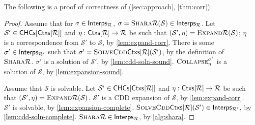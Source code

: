 The following is a proof of correctness of \sys
(\autoref{sec:approach}, \autoref{thm:corr}).
%
\begin{proof}
  Assume that for $\sigma \in \mathsf{Interps_{  \mathcal{R}  }}$, $\sigma =
  \textsc{Shara}{ \mathcal{R} }( \mathcal{S} ) \in \mathsf{Interps_{  \mathcal{R}  }}$.
  Let $\mathcal{S'} \in \mathsf{CHCs}[  \mathsf{Ctxs}[  \mathcal{R}  ]  ]$ and $\eta :
  \mathsf{Ctxs}[  \mathcal{R}  ] \to \mathcal{R}$ be such that $(\mathcal{S}',
  \eta) = \textsc{Expand}{ \mathcal{R} }( \mathcal{S} )$;
  $\eta$ is a correspondence from $\mathcal{S'}$ to $\mathcal{S}$, by
  \autoref{lem:expand-corr}.
  There is some $\sigma' \in \mathsf{Interps_{  \mathcal{R}'  }}$ such that
  $\sigma' = \textsc{SolveCdd}{ \mathsf{Ctxs}[  \mathcal{R}  ] }( \mathcal{S}' )$, by
  the definition of $\textsc{Shara}{ \mathcal{R} }$.
  $\sigma'$ is a solution of $\mathcal{S}'$, by
  \autoref{lem:cdd-soln-sound}.
  $\textsc{Collapse}_{ \eta }^{ \sigma' }$ is a solution of $\mathcal{S}$, by
  \autoref{lem:expansion-sound}.

  Assume that $\mathcal{S}$ is solvable.
  Let $\mathcal{S'} \in \mathsf{CHCs}[  \mathsf{Ctxs}[  \mathcal{R}  ]  ]$ and $\eta :
  \mathsf{Ctxs}[  \mathcal{R}  ] \to \mathcal{R}$ be such that $(\mathcal{S}',
  \eta) = \textsc{Expand}{ \mathcal{R} }( \mathcal{S} )$.
  $\mathcal{S}'$ is a CDD expansion of $\mathcal{S}$, by
  \autoref{lem:expand-corr}.
  $\mathcal{S}'$ is solvable, by \autoref{lem:expansion-complete}.
  $\textsc{SolveCdd}{ \mathsf{Ctxs}[  \mathcal{R}  ] }( \mathcal{S'}) \in \mathsf{Interps_{ 
    \mathcal{R'}  }} $, by \autoref{lem:cdd-soln-complete}.
  $\textsc{Shara}{\mathcal{R}} \in \mathsf{Interps_{  \mathcal{R}  }}$, by
  \autoref{alg:shara}.
\end{proof}

